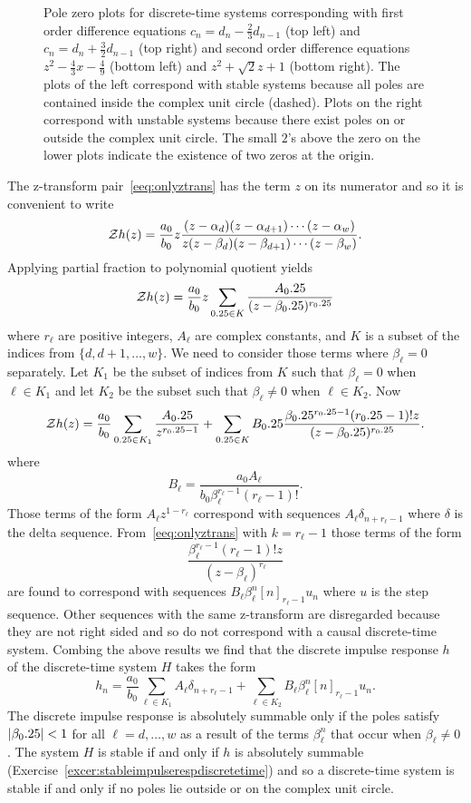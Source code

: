 {\begin{figure}[p]
\begin{tikzpicture}[scale=\zscale]
  \end{tikzpicture}
  \caption{Pole zero plots for discrete-time systems corresponding with first order difference equations $c_n = d_n - \tfrac{2}{3} d_{n-1}$ (top left) and $c_n = d_n + \tfrac{3}{2} d_{n-1}$ (top right) and second order difference equations $z^2 - \tfrac{4}{3} x - \tfrac{4}{9}$ (bottom left) and $z^2 + \sqrt{2}z + 1$ (bottom right).  The plots of the left correspond with stable systems because all poles are contained inside the complex unit circle (dashed).  Plots on the right correspond with unstable systems because there exist poles on or outside the complex unit circle.  The small $2$'s above the zero on the lower plots indicate the existence of two zeros at the origin.}\label{fig:polezeroplotdisctime}
\end{figure}
}

The z-transform pair~\eqref{eeq:onlyztrans} has the term $z$ on its numerator and so it is convenient to write
\[
\calZ h(z) = \frac{a_0}{b_0} z \frac{(z-\alpha_d)(z - \alpha_{d+1})\cdots(z - \alpha_{w})}{z(z-\beta_d)(z - \beta_{d+1})\cdots(z - \beta_{w})}.
\]
Applying partial fraction to polynomial quotient yields
\[
\calZ h(z) = \frac{a_0}{b_0} z \sum_{\ell \in K} \frac{A_\ell }{(z - \beta_\ell)^{r_\ell}}
\] 
where $r_\ell$ are positive integers, $A_\ell$ are complex constants, and $K$ is a subset of the indices from $\{d,d+1,\dots,w\}$.  We need to consider those terms where $\beta_\ell = 0$ separately.  Let $K_1$ be the subset of indices from $K$ such that $\beta_\ell = 0$ when $\ell \in K_1$ and let $K_2$ be the subset such that $\beta_\ell \neq 0$ when $\ell \in K_2$.  Now 
\[
\calZ h(z) = \frac{a_0}{b_0} \sum_{\ell \in K_1} \frac{A_\ell }{z^{r_\ell-1}} + \sum_{\ell \in K} B_\ell \frac{  \beta_\ell^{r_\ell-1} (r_\ell-1)! z }{(z - \beta_\ell)^{r_\ell}}.
\] 
where
\[
B_\ell = \frac{a_0 A_\ell}{b_0 \beta_\ell^{r_\ell-1} (r_\ell-1)! }.
\] 
Those terms of the form $A_\ell z^{1 - r_\ell}$ correspond with sequences $A_\ell \delta_{n+r_\ell-1}$ where $\delta$ is the delta sequence.  From~\eqref{eeq:onlyztrans} with $k = r_\ell - 1$ those terms of the form 
\[
\frac{\beta_\ell^{r_\ell-1} (r_\ell-1)! z }{(z - \beta_\ell)^{r_\ell}}
\]
are found to correspond with sequences $B_\ell \beta_\ell^n [n]_{r_\ell-1} u_n$ where $u$ is the step sequence.  Other sequences with the same z-transform are disregarded because they are not right sided and so do not correspond with a causal discrete-time system.  Combing the above results we find that the discrete impulse response $h$ of the discrete-time system $H$ takes the form
\[
h_n = \frac{a_0}{b_0} \sum_{\ell \in K_1} A_\ell \delta_{n+r_\ell-1} + \sum_{\ell \in K_2} B_\ell \beta_\ell^n [n]_{r_\ell-1} u_n.
\]
The discrete impulse response is absolutely summable only if the poles satisfy $\abs{\beta_\ell} < 1$ for all $\ell = d,\dots,w$ as a result of the terms $\beta_\ell^n$ that occur when $\beta_\ell \neq 0$.  The system $H$ is stable if and only if $h$ is absolutely summable (Exercise~\ref{excer:stableimpulserespdiscretetime}) and so a discrete-time system is stable if and only if no poles lie outside or on the complex unit circle.

